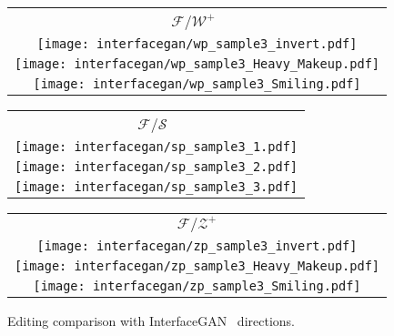 \documentclass[10pt,twocolumn,letterpaper]{article}
\newcommand{\FWS}{\mathcal{F}/\mathcal{W}^{+}}
\newcommand{\FZS}{\mathcal{F}/\mathcal{Z}^{+}}
\begin{document}
\begin{figure}[tb]
\begin{minipage}[b]{0.16\linewidth}
\begin{tabular}{c}
\end{tabular}
\end{minipage}%
\begin{minipage}[b]{0.02\linewidth}
\end{minipage}%
\begin{minipage}[b]{0.16\linewidth}
\begin{tabular}{c}
\footnotesize $\FWS$\!~\!\cite{Kang_2021_ICCV} \\
\texttt{[image: interfacegan/wp\_sample3\_invert.pdf]} \\
\texttt{[image: interfacegan/wp\_sample3\_Heavy\_Makeup.pdf]} \\
\texttt{[image: interfacegan/wp\_sample3\_Smiling.pdf]} \\
\end{tabular}
\end{minipage}%
\begin{minipage}[b]{0.02\linewidth}
\end{minipage}%
\begin{minipage}[b]{0.16\linewidth}
\begin{tabular}{c}
\footnotesize $\mathcal{F}\!/\!\mathcal{S}$~\cite{yao2022style} \\
\texttt{[image: interfacegan/sp\_sample3\_1.pdf]} \\
\texttt{[image: interfacegan/sp\_sample3\_2.pdf]} \\
\texttt{[image: interfacegan/sp\_sample3\_3.pdf]} \\
\end{tabular}
\end{minipage}%
\begin{minipage}[b]{0.02\linewidth}
\end{minipage}%
\begin{minipage}[b]{0.16\linewidth}
\begin{tabular}{c}
\footnotesize $\FZS$ \\
\texttt{[image: interfacegan/zp\_sample3\_invert.pdf]} \\
\texttt{[image: interfacegan/zp\_sample3\_Heavy\_Makeup.pdf]} \\
\texttt{[image: interfacegan/zp\_sample3\_Smiling.pdf]} \\
\end{tabular}
\end{minipage}%
\egroup
\vspace{-0.8em}
\caption{Editing comparison with InterfaceGAN~\cite{shen2020interfacegan} directions.\vspace{-0.8em}}\label{fig:interfacegan}
\end{figure}
\end{document}
